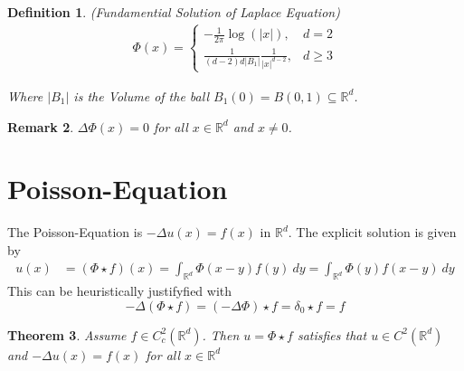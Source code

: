 \documentclass{report}
\theoremstyle{tommy}
\newtheorem{defn}{Definition}
\newtheorem{thm}[defn]{Theorem}
\newtheorem{rem}[defn]{Remark}
\begin{document}
  \begin{defn} 
    (Fundamential Solution of Laplace Equation)
    \begin{align*}
      \Phi(x) = \begin{cases}
        - \frac{1}{2 \pi} \log(|x|), & d = 2 \\
        \frac{1}{(d-2) d |B_1|} \frac{1}{|x|^{d-2}}, & d \ge 3
      \end{cases}
    \end{align*}
    
    Where \( |B_1| \) is the Volume of the ball \(B_1(0) = B(0, 1) \subseteq \mathbb{R}^d\).

  \end{defn}

  \begin{rem}
    \(\Delta \Phi(x) = 0\) for all \(x \in \mathbb{R}^d\) and \(x \ne 0\). 
  \end{rem}


  \section{Poisson-Equation}
  The Poisson-Equation is \(-\Delta u(x) = f(x)\) in \(\mathbb{R}^d\). The explicit solution is given by
  \begin{align*}
    u(x) &= (\Phi \star f)(x)
    = \int_{\mathbb{R}^d} \Phi(x-y)f(y) \ dy 
    = \int_{\mathbb{R}^d} \Phi(y)f(x-y) \ dy
  \end{align*}
  This can be heuristically justifyfied with \[-\Delta (\Phi \star f) = (-\Delta \Phi) \star f = \delta_0 \star f = f\]


  \begin{thm} \label{solution-for-poisson}
    Assume \(f \in C_c^2(\mathbb{R}^d)\). Then \(u = \Phi \star f\) satisfies that \(u \in C^2(\mathbb{R}^d)\) and \(- \Delta u(x) = f(x)\) for all \(x \in \mathbb{R}^d\)
  \end{thm}
\end{document}
